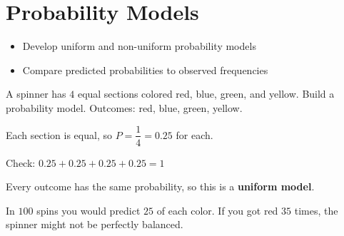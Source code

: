 \section{Probability Models}

\begin{stepGoal}
\begin{itemize}
    \item Develop uniform and non-uniform probability models
    \item Compare predicted probabilities to observed frequencies
\end{itemize}
\end{stepGoal}

\begin{stepVocabBox}
\end{stepVocabBox}

\begin{stepsCard}
\end{stepsCard}

\begin{stepExample}{A spinner has $4$ equal sections colored red, blue, green, and yellow. Build a probability model.}
     Outcomes: red, blue, green, yellow.

     Each section is equal, so $P = \dfrac{1}{4} = 0.25$ for each.\par
    Check: $0.25 + 0.25 + 0.25 + 0.25 = 1$ \checkmark

     Every outcome has the same probability, so this is a \textbf{uniform model}.

     In $100$ spins you would predict $25$ of each color. If you got red $35$ times, the spinner might not be perfectly balanced.
\end{stepExample}

